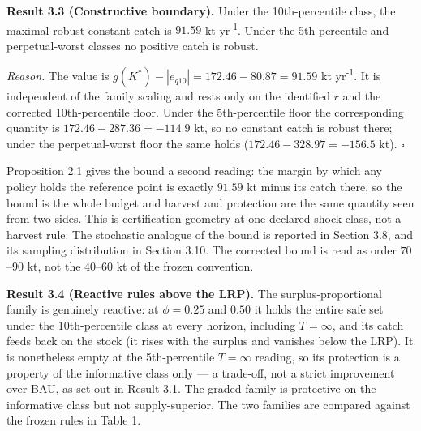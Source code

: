 \textbf{Result 3.3 (Constructive boundary).} Under the 10th-percentile
class, the maximal robust constant catch is \(91.59\) kt yr\textsuperscript{-1}. Under the
5th-percentile and perpetual-worst classes no positive catch is robust.

\emph{Reason.} The value is
\(g(K^*) - |e_{q10}| = 172.46 - 80.87 = 91.59\) kt yr\textsuperscript{-1}. It is
independent of the family scaling and rests only on the identified \(r\)
and the corrected 10th-percentile floor. Under the 5th-percentile floor
the corresponding quantity is \(172.46 - 287.36 = -114.9\) kt, so no
constant catch is robust there; under the perpetual-worst floor the same
holds (\(172.46 - 328.97 = -156.5\) kt). \ensuremath{\square}

Proposition 2.1 gives the bound a second reading: the margin by which
any policy holds the reference point is exactly \(91.59\) kt minus its
catch there, so the bound is the whole budget and harvest and protection
are the same quantity seen from two sides. This is certification
geometry at one declared shock class, not a harvest rule. The stochastic analogue of the bound is reported in
Section 3.8, and its sampling distribution in Section 3.10. The
corrected bound is read as order \(70\)--\(90\) kt, not the
\(40\)--\(60\) kt of the frozen convention.

\textbf{Result 3.4 (Reactive rules above the LRP).} The
surplus-proportional family is genuinely reactive: at \(\phi = 0.25\)
and \(0.50\) it holds the entire safe set under the 10th-percentile
class at every horizon, including \(T = \infty\), and its catch feeds
back on the stock (it rises with the surplus and vanishes below the
LRP). It is nonetheless empty at the 5th-percentile \(T=\infty\)
reading, so its protection is a property of the informative class only
--- a trade-off, not a strict improvement over BAU, as set out in Result
3.1. The graded family is protective on the informative class but not
supply-superior. The two families are compared against the frozen rules
in Table 1.

